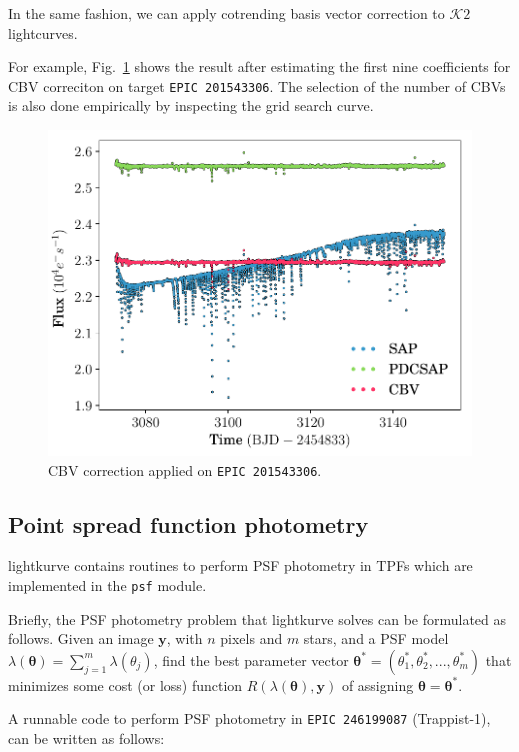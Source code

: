 \documentclass{article}
\begin{document}
In the same fashion, we can apply cotrending basis vector correction to
$\mathcal{K}\mathit{2}$ lightcurves.

For example, Fig.~\ref{fig:cbv-correction-k2} shows the result after estimating
the first nine coefficients for CBV correciton on target \texttt{EPIC 201543306}.
The selection of the number of CBVs is also done empirically by inspecting the
grid search curve.
\begin{figure}[!htb]
    \centering
    \includegraphics[scale=.5]{figs/cbv-k2.pdf}
    \caption{CBV correction applied on \texttt{EPIC 201543306}.}
    \label{fig:cbv-correction-k2}
\end{figure}

\subsection{Point spread function photometry}

lightkurve contains routines to perform PSF photometry in TPFs
which are implemented in the \texttt{psf} module.

Briefly, the PSF photometry problem that lightkurve solves can be formulated as
follows. Given an image $\bm{y}$, with $n$ pixels and $m$ stars, and a PSF model
$\lambda(\bm{\theta}) = \sum_{j=1}^{m} \lambda({\theta}_j)$,
find the best parameter vector
$\bm{\theta}^{*} = (\theta_1^{*}, \theta_2^{*}, ..., \theta_m^{*})$
that minimizes some cost (or loss) function $R(\lambda(\bm{\theta}), \bm{y})$
of assigning $\bm{\theta} = \bm{\theta}^{*}$.

A runnable code to perform PSF photometry in \texttt{EPIC 246199087}
(Trappist-1), can be written as follows:
\end{document}
